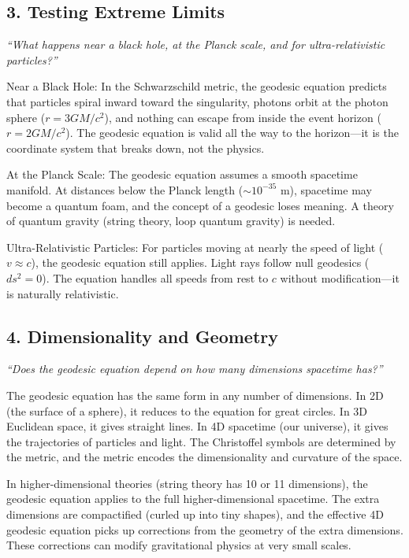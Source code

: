 \documentclass[11pt,openright]{book}
\begin{document}
\subsection*{3. Testing Extreme Limits}
\textit{``What happens near a black hole, at the Planck scale, and for ultra-relativistic particles?''}

Near a Black Hole: In the Schwarzschild metric, the geodesic equation predicts that particles spiral inward toward the singularity, photons orbit at the photon sphere ($r = 3GM/c^2$), and nothing can escape from inside the event horizon ($r = 2GM/c^2$). The geodesic equation is valid all the way to the horizon---it is the coordinate system that breaks down, not the physics.

At the Planck Scale: The geodesic equation assumes a smooth spacetime manifold. At distances below the Planck length ($\sim 10^{-35}$ m), spacetime may become a quantum foam, and the concept of a geodesic loses meaning. A theory of quantum gravity (string theory, loop quantum gravity) is needed.

Ultra-Relativistic Particles: For particles moving at nearly the speed of light ($v \approx c$), the geodesic equation still applies. Light rays follow null geodesics ($ds^2 = 0$). The equation handles all speeds from rest to $c$ without modification---it is naturally relativistic.

\subsection*{4. Dimensionality and Geometry}
\textit{``Does the geodesic equation depend on how many dimensions spacetime has?''}

The geodesic equation has the same form in any number of dimensions. In 2D (the surface of a sphere), it reduces to the equation for great circles. In 3D Euclidean space, it gives straight lines. In 4D spacetime (our universe), it gives the trajectories of particles and light. The Christoffel symbols are determined by the metric, and the metric encodes the dimensionality and curvature of the space.

In higher-dimensional theories (string theory has 10 or 11 dimensions), the geodesic equation applies to the full higher-dimensional spacetime. The extra dimensions are compactified (curled up into tiny shapes), and the effective 4D geodesic equation picks up corrections from the geometry of the extra dimensions. These corrections can modify gravitational physics at very small scales.
\end{document}
